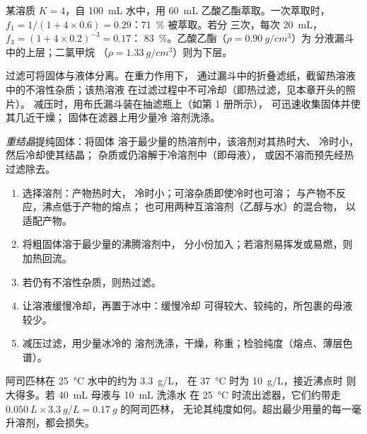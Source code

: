 \begin{example}[一份还是三份]
某溶质 $K = 4$，自 \qty{100}{mL} 水中，用
\qty{60}{mL} 乙酸乙酯萃取。一次萃取时，
$f_1 = 1/(1 + 4 \times 0.6) = 0.29$：\qty{71}{\percent} 被萃取。若分
三次，每次 \qty{20}{mL}，$f_3 = (1 + 4 \times 0.2)^{-3} = 0.17$：
\qty{83}{\percent}。乙酸乙酯（$\rho = \qty{0.90}{g/cm^3}$）为
分液漏斗中的上层；二氯甲烷
（$\rho = \qty{1.33}{g/cm^3}$）则为下层。
\end{example}

过滤可将固体与液体分离。在重力作用下，
通过漏斗中的折叠滤纸，截留热溶液中的不溶性杂质；该热溶液
在过滤过程中不可冷却（即热过滤，见本章开头的照片）。
减压时，用布氏漏斗装在抽滤瓶上（如第 1 册所示），
可迅速收集固体并使其几近干燥；
固体在滤器上用少量冷
溶剂洗涤。

\begin{definition}[重结晶]\label{def:b1:lab-techniques-1:recrystallisation}
\emph{重结晶}提纯固体：将固体
溶于最少量的热溶剂中，该溶剂对其热时大、
冷时小，然后冷却使其结晶；
杂质或仍溶解于冷溶剂中（即母液），
或因不溶而预先经热过滤除去。
\end{definition}

\begin{method}[固体重结晶]\label{met:b1:lab-techniques-1:recrystallise}
\begin{enumerate}
  \item 选择溶剂：产物热时大，
        冷时小；可溶杂质即使冷时也可溶；
        与产物不反应，沸点低于产物的熔点；
        也可用两种互溶溶剂（乙醇与水）的混合物，
        以适配产物。
  \item 将粗固体溶于最少量的沸腾溶剂中，
        分小份加入；若溶剂易挥发或易燃，则
        加热回流。
  \item 若仍有不溶性杂质，则热过滤。
  \item 让溶液缓慢冷却，再置于冰中：缓慢冷却
        可得较大、较纯的，所包裹的母液较少。
  \item 减压过滤，用少量冰冷的
        溶剂洗涤，干燥，称重；检验纯度（熔点、薄层色谱）。
\end{enumerate}
\end{method}

\begin{example}[纯度的代价]
阿司匹林在 \qty{25}{\celsius} 水中的约为 \qty{3.3}{g/L}，
在 \qty{37}{\celsius} 时为 \qty{10}{g/L}，接近沸点时
则大得多。若 \qty{40}{mL} 母液与 \qty{10}{mL} 洗涤水
在 \qty{25}{\celsius} 时流出滤器，它们约带走
$\qty{0.050}{L} \times \qty{3.3}{g/L} = \qty{0.17}{g}$ 的阿司匹林，
无论其纯度如何。超出最少用量的每一毫升溶剂，都会损失。
\end{example}

